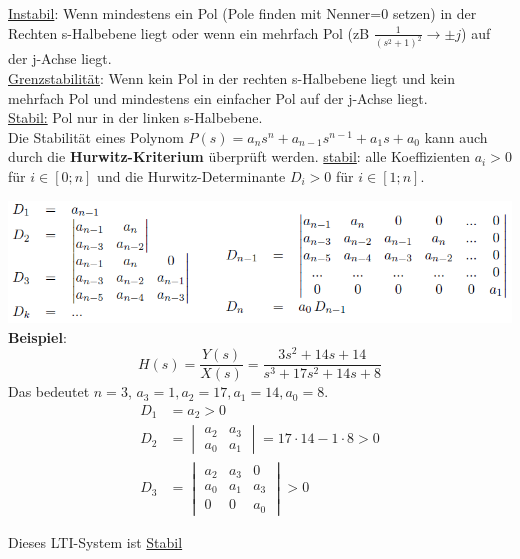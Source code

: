 \noindent\underline{Instabil}: Wenn mindestens ein Pol (Pole finden mit Nenner=0 setzen) in der Rechten s-Halbebene liegt oder wenn ein mehrfach Pol (zB $\frac{1}{(s^2 + 1)^2} \rightarrow \pm j$) auf der j-Achse liegt.\\
\underline{Grenzstabilität}: Wenn kein Pol in der rechten s-Halbebene liegt und kein mehrfach Pol und mindestens ein einfacher Pol auf der j-Achse liegt.\\
\underline{Stabil:} Pol nur in der linken s-Halbebene.\\

\noindent Die Stabilität eines Polynom $P(s) = a_ns^n + a_{n-1}s^{n-1}+a_1s + a_0$ kann auch durch die \textbf{Hurwitz-Kriterium} überprüft werden. 
\underline{stabil}: alle Koeffizienten $a_i > 0$ für $i \in [0;n]$ und die Hurwitz-Determinante $D_i > 0$ für $i\in[1;n]$.

\includegraphics[width=\columnwidth]{Images/hurwitz}
\textbf{Beispiel}:
\[
H(s) = \frac{Y(s)}{X(s)} = \frac{3s^2 + 14s + 14}{s^3 + 17s^2 + 14s + 8}
\]
Das bedeutet $n=3$, $a_3 = 1, a_2=17, a_1 = 14, a_0=8$. 
\begin{align*}
	D_1 &= a_2 > 0 \\
	D_2 &= \begin{vmatrix*} a_2 & a_3 \\ a_0 & a_1 \end{vmatrix*} = 17\cdot 14 - 1\cdot 8 > 0 \\
	D_3 &= \begin{vmatrix*} a_2 & a_3 & 0 \\ a_0 & a_1 & a_3 \\ 0 & 0 & a_0	\end{vmatrix*} > 0
\end{align*}

Dieses LTI-System ist \underline{Stabil}

